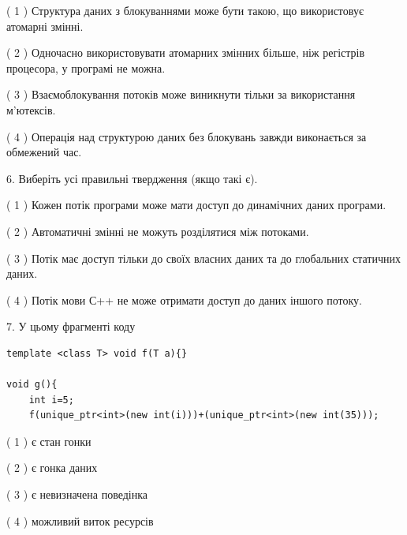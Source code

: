 \documentclass[12pt, ukrainian]{article}
\begin{document}
\begin {large}
{( 1 ) Структура даних з блокуваннями може бути такою, що використовує атомарні змінні.%

( 2 ) Одночасно використовувати атомарних змінних більше, ніж регістрів процесора, у програмі не можна.%

( 3 ) Взаємоблокування потоків може виникнути тільки за використання м’ютексів.%

( 4 ) Операція над структурою даних без блокувань завжди виконається за обмежений час.%
\newpage



\vspace{5mm}
6. Виберіть усі правильні твердження (якщо такі є).\par
\vspace{2mm}

( 1 ) Кожен потік програми може мати доступ до динамічних даних програми.%

( 2 ) Автоматичні змінні не можуть розділятися між потоками.%

( 3 ) Потік має доступ тільки до своїх власних даних та до глобальних статичних даних.%

( 4 ) Потік мови С++ не може отримати доступ до даних іншого потоку.%


\vspace{5mm}
7. У цьому фрагменті коду
\begin{verbatim}
template <class T> void f(T a){}

void g(){
    int i=5;
    f(unique_ptr<int>(new int(i)))+(unique_ptr<int>(new int(35)));
\end{verbatim}
( 1 ) є стан гонки%

( 2 ) є гонка даних%

( 3 ) є невизначена поведінка%

( 4 ) можливий виток ресурсів%
}
\end {large}
\end{document}
